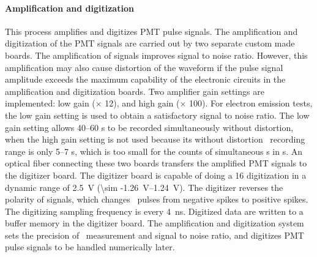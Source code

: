 \paragraph{Amplification and digitization} %
This process amplifies and digitizes PMT pulse signals. The amplification and digitization of the PMT signals are carried out by two separate custom made boards. The amplification of signals improves signal to noise ratio. %
However, this amplification may also cause distortion of the waveform if the pulse signal amplitude exceeds the maximum capability of the electronic circuits in the amplification and digitization boards. Two amplifier gain settings are implemented: low gain ($\times$ 12), and high gain ($\times$ 100). For electron emission tests, the low gain setting is used to obtain a satisfactory signal to noise ratio. The low gain setting allows \numrange{40}{60} \sphe s to be recorded simultaneously without distortion, when the high gain setting is not used because its without distortion \sphe\ recording range is only \numrange{5}{7} \sphe s, which is too small for the counts of simultaneous \sphe s in \ees s.
An optical fiber connecting these two boards transfers the amplified PMT signals to the digitizer board. The digitizer board is capable of doing a \SI{16}{\bit} digitization in a dynamic range of \SI{2.5}{\V} (\SIrange{\sim -1.26}{1.24}{\V}). The digitizer reverses the polarity of signals, which changes \sphe\ pulses from negative spikes to positive spikes. The digitizing sampling frequency is every \SI{4}{\ns}. Digitized data are written to a buffer memory in the digitizer board. %
The amplification and digitization system sets the precision of \sphe\ measurement and signal to noise ratio, and digitizes PMT pulse signals to be handled numerically later.

